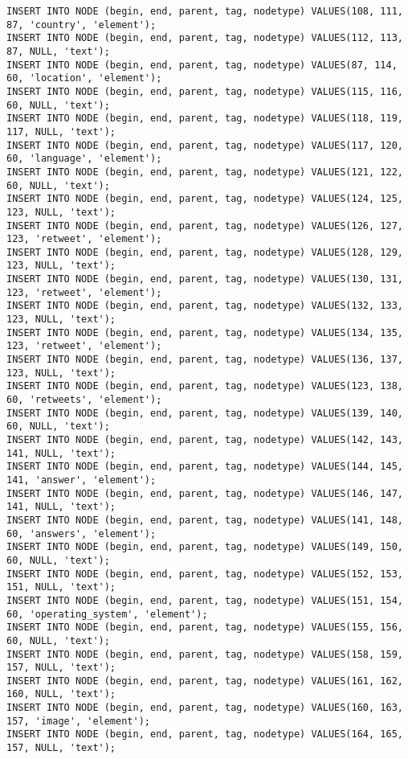 \begin{verbatim}
INSERT INTO NODE (begin, end, parent, tag, nodetype) VALUES(108, 111, 87, 'country', 'element');
INSERT INTO NODE (begin, end, parent, tag, nodetype) VALUES(112, 113, 87, NULL, 'text');
INSERT INTO NODE (begin, end, parent, tag, nodetype) VALUES(87, 114, 60, 'location', 'element');
INSERT INTO NODE (begin, end, parent, tag, nodetype) VALUES(115, 116, 60, NULL, 'text');
INSERT INTO NODE (begin, end, parent, tag, nodetype) VALUES(118, 119, 117, NULL, 'text');
INSERT INTO NODE (begin, end, parent, tag, nodetype) VALUES(117, 120, 60, 'language', 'element');
INSERT INTO NODE (begin, end, parent, tag, nodetype) VALUES(121, 122, 60, NULL, 'text');
INSERT INTO NODE (begin, end, parent, tag, nodetype) VALUES(124, 125, 123, NULL, 'text');
INSERT INTO NODE (begin, end, parent, tag, nodetype) VALUES(126, 127, 123, 'retweet', 'element');
INSERT INTO NODE (begin, end, parent, tag, nodetype) VALUES(128, 129, 123, NULL, 'text');
INSERT INTO NODE (begin, end, parent, tag, nodetype) VALUES(130, 131, 123, 'retweet', 'element');
INSERT INTO NODE (begin, end, parent, tag, nodetype) VALUES(132, 133, 123, NULL, 'text');
INSERT INTO NODE (begin, end, parent, tag, nodetype) VALUES(134, 135, 123, 'retweet', 'element');
INSERT INTO NODE (begin, end, parent, tag, nodetype) VALUES(136, 137, 123, NULL, 'text');
INSERT INTO NODE (begin, end, parent, tag, nodetype) VALUES(123, 138, 60, 'retweets', 'element');
INSERT INTO NODE (begin, end, parent, tag, nodetype) VALUES(139, 140, 60, NULL, 'text');
INSERT INTO NODE (begin, end, parent, tag, nodetype) VALUES(142, 143, 141, NULL, 'text');
INSERT INTO NODE (begin, end, parent, tag, nodetype) VALUES(144, 145, 141, 'answer', 'element');
INSERT INTO NODE (begin, end, parent, tag, nodetype) VALUES(146, 147, 141, NULL, 'text');
INSERT INTO NODE (begin, end, parent, tag, nodetype) VALUES(141, 148, 60, 'answers', 'element');
INSERT INTO NODE (begin, end, parent, tag, nodetype) VALUES(149, 150, 60, NULL, 'text');
INSERT INTO NODE (begin, end, parent, tag, nodetype) VALUES(152, 153, 151, NULL, 'text');
INSERT INTO NODE (begin, end, parent, tag, nodetype) VALUES(151, 154, 60, 'operating_system', 'element');
INSERT INTO NODE (begin, end, parent, tag, nodetype) VALUES(155, 156, 60, NULL, 'text');
INSERT INTO NODE (begin, end, parent, tag, nodetype) VALUES(158, 159, 157, NULL, 'text');
INSERT INTO NODE (begin, end, parent, tag, nodetype) VALUES(161, 162, 160, NULL, 'text');
INSERT INTO NODE (begin, end, parent, tag, nodetype) VALUES(160, 163, 157, 'image', 'element');
INSERT INTO NODE (begin, end, parent, tag, nodetype) VALUES(164, 165, 157, NULL, 'text');

\end{verbatim}
